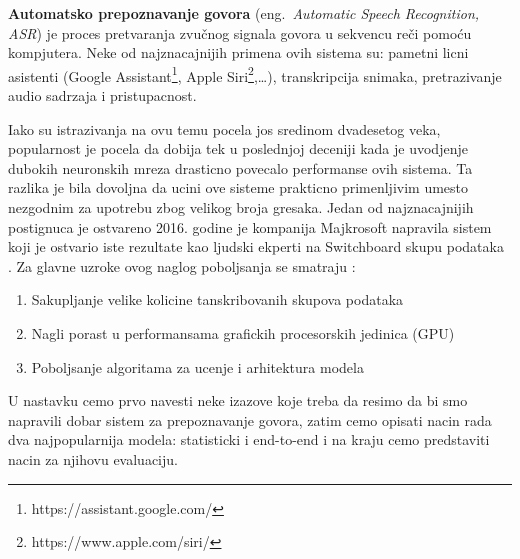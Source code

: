 \documentclass[a4paper]{article}
\begin{document}
\textbf{Automatsko prepoznavanje govora} (eng.~{\em Automatic Speech Recognition, ASR}) je proces pretvaranja zvučnog signala govora u sekvencu reči pomoću kompjutera.
Neke od najznacajnijih primena ovih sistema su: pametni licni asistenti (Google Assistant\footnote{https://assistant.google.com/}, Apple Siri\footnote{https://www.apple.com/siri/},\dots), transkripcija snimaka, pretrazivanje audio sadrzaja i pristupacnost.

Iako su istrazivanja na ovu temu pocela jos sredinom dvadesetog veka, popularnost je pocela da dobija tek u poslednjoj deceniji kada je uvodjenje dubokih neuronskih mreza drasticno povecalo performanse ovih sistema.
Ta razlika je bila dovoljna da ucini ove sisteme prakticno primenljivim umesto nezgodnim za upotrebu zbog velikog broja gresaka.
Jedan od najznacajnijih postignuca je ostvareno 2016. godine je kompanija Majkrosoft napravila sistem koji je ostvario iste rezultate kao ljudski ekperti na Switchboard skupu podataka \cite{switchboard}.
Za glavne uzroke ovog naglog poboljsanja se smatraju \cite{hannun2021history}:
\begin{enumerate}
  \item Sakupljanje velike kolicine tanskribovanih skupova podataka
  \item Nagli porast u performansama grafickih procesorskih jedinica (GPU)
  \item Poboljsanje algoritama za ucenje i arhitektura modela
\end{enumerate}

U nastavku cemo prvo navesti neke izazove koje treba da resimo da bi smo napravili dobar sistem za prepoznavanje govora, zatim cemo opisati nacin rada dva najpopularnija modela: statisticki i end-to-end i na kraju cemo predstaviti nacin za njihovu evaluaciju.
\end{document}
